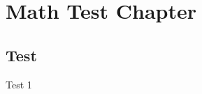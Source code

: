 \chapter{Math Test Chapter}\label{ch:mathtest} %

\section{Test}

\begin{definition}
    Test 1
\end{definition}
